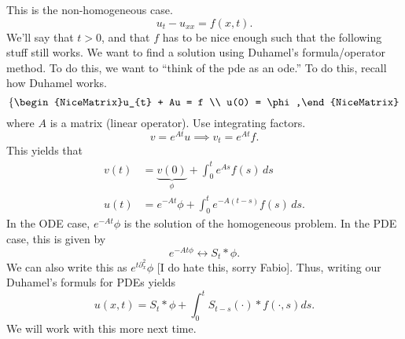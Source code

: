 \begin{example}
	This is the non-homogeneous case.
	\[ u_{t} - u_{x x} = f(x, t). \]
	We'll say that \( t > 0 \), and that \( f \) has to be nice enough such that the following stuff still works. We want to find a solution using Duhamel's formula/operator method. To do this, we want to ``think of the pde as an ode.'' To do this, recall how Duhamel works.
	\[ \left\{\begin{NiceMatrix}u_{t} + Au = f \\ u(0) = \phi,\end{NiceMatrix}\right.  \]
	where \( A \) is a matrix (linear operator). Use integrating factors.
	\[ v = e^{At}u \implies v_{t} = e^{At}f. \]
	This yields that
	\begin{align*}
		v(t) &= \underbrace{v(0)}_{\phi} + \int_{0}^{t} e^{As}f(s) \, ds \\
		u(t) &= e^{-At} \phi + \int_{0}^{t} e^{-A (t - s)} f(s) \, ds.
	\end{align*}
	In the ODE case, \( e^{-A t} \phi \) is the solution of the homogeneous problem. In the PDE case, this is given by
	\[ e^{-At \phi} \leftrightarrow S_{t} * \phi. \]
	We can also write this as \( e^{t \partial_{x}^{2}} \phi \) [I do hate this, sorry Fabio]. Thus, writing our Duhamel's formuls for PDEs yields
	\[ u(x, t) = S_{t} * \phi + \int_{0}^{t} S_{t-s}( \cdot) * f( \cdot, s) ds. \]
	We will work with this more next time.

\end{example}

